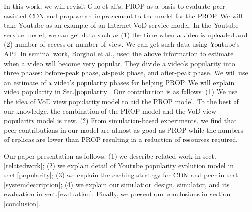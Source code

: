 \documentclass[10pt,final,journal,a4paper]{IEEEtran}
\begin{document}
In this work, we will revisit Guo et al.'s, \cite{1613869} PROP as a basis to evaluate peer-assisted CDN and propose an improvement to the model for the PROP.
We will take Youtube as an example of an Internet VoD service model.
In the Youtube service model, we can get data such as (1) the time when a video is uploaded and (2) number of access or number of view.
We can get such data using Youtube's API.
In seminal work, Borghol et al., \cite{Borghol:2011:CMP:2039452.2039717} used the above information to estimate when a video will become very popular.
They divide a video's popularity into three phases: before-peak phase, at-peak phase, and after-peak phase.
We will use an estimate of a video's popularity phases for helping PROP.
We will explain video popularity in Sec.\ref{popularity}.
Our contribution is as follows:
(1) We use the idea of VoD view popularity model to aid the PROP model. 
To the best of our knowledge, the combination of the PROP model and the VoD view popularity model is new.
(2) From simulation-based experiments, we find that peer contributions in our model are almost as good as  PROP while the numbers of replicas are lower than PROP resulting in a reduction of resources required.

Our paper presentation as follows: (1) we describe related work in sect.\ref{relatedwork}; (2) we explain detail of Youtube popularity evolution model in sect.\ref{popularity}; (3) we explain the caching strategy for CDN and peer in sect.\ref{systemdescription}; (4) we explain our simulation design, simulator, and its evaluation in sect.\ref{evaluation}.
Finally, we present our conclusions in section \ref{conclusion}.
\end{document}
